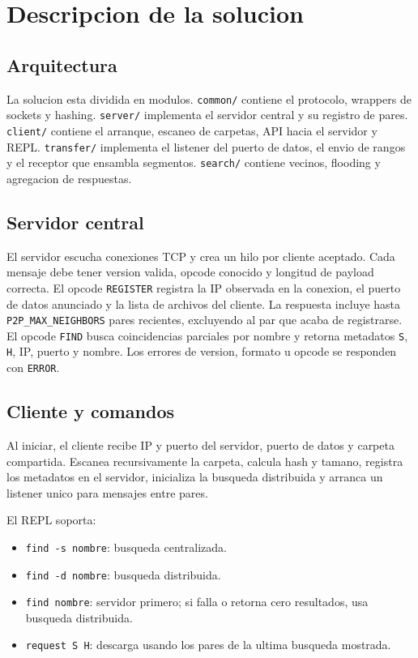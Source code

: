 \section{Descripcion de la solucion}

\subsection{Arquitectura}

La solucion esta dividida en modulos. \texttt{common/} contiene el protocolo,
wrappers de sockets y hashing. \texttt{server/} implementa el servidor central
y su registro de pares. \texttt{client/} contiene el arranque, escaneo de
carpetas, API hacia el servidor y REPL. \texttt{transfer/} implementa el
listener del puerto de datos, el envio de rangos y el receptor que ensambla
segmentos. \texttt{search/} contiene vecinos, flooding y agregacion de
respuestas.

\subsection{Servidor central}

El servidor escucha conexiones TCP y crea un hilo por cliente aceptado. Cada
mensaje debe tener version valida, opcode conocido y longitud de payload
correcta. El opcode \texttt{REGISTER} registra la IP observada en la conexion,
el puerto de datos anunciado y la lista de archivos del cliente. La respuesta
incluye hasta \texttt{P2P\_MAX\_NEIGHBORS} pares recientes, excluyendo al par
que acaba de registrarse. El opcode \texttt{FIND} busca coincidencias parciales
por nombre y retorna metadatos \texttt{S}, \texttt{H}, IP, puerto y nombre.
Los errores de version, formato u opcode se responden con \texttt{ERROR}.

\subsection{Cliente y comandos}

Al iniciar, el cliente recibe IP y puerto del servidor, puerto de datos y
carpeta compartida. Escanea recursivamente la carpeta, calcula hash y tamano,
registra los metadatos en el servidor, inicializa la busqueda distribuida y
arranca un listener unico para mensajes entre pares.

El REPL soporta:
\begin{itemize}
  \item \texttt{find -s nombre}: busqueda centralizada.
  \item \texttt{find -d nombre}: busqueda distribuida.
  \item \texttt{find nombre}: servidor primero; si falla o retorna cero
  resultados, usa busqueda distribuida.
  \item \texttt{request S H}: descarga usando los pares de la ultima busqueda
  mostrada.
\end{itemize}

